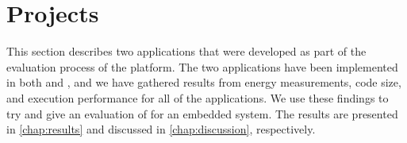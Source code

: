 
\section{Projects}
\label{sec:impl:projects}

This section describes two applications that were developed as part of the evaluation process of the {\rg} platform.
The two applications have been implemented in both {\rust} and {\C}, and we have gathered results from energy measurements, code size, and execution performance for all of the applications.
We use these findings to try and give an evaluation of {\rust} for an embedded system.
The results are presented in \autoref{chap:results} and discussed in \autoref{chap:discussion}, respectively.



